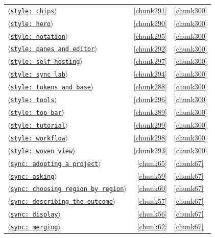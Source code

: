 \documentclass[10pt,a4paper]{article}
\newcounter{chunk}
\newcommand{\chunkname}[1]{\ensuremath{\langle}\texttt{#1}\ensuremath{\rangle}}
\begin{document}
\begin{longtable}{@{}p{}rp{}@{}}
\hyperref[chunk291]{\chunkname{style: chips}} & \ref*{chunk291} & \hyperref[chunk300]{\ref*{chunk300}} \\
\hyperref[chunk290]{\chunkname{style: hero}} & \ref*{chunk290} & \hyperref[chunk300]{\ref*{chunk300}} \\
\hyperref[chunk295]{\chunkname{style: notation}} & \ref*{chunk295} & \hyperref[chunk300]{\ref*{chunk300}} \\
\hyperref[chunk292]{\chunkname{style: panes and editor}} & \ref*{chunk292} & \hyperref[chunk300]{\ref*{chunk300}} \\
\hyperref[chunk297]{\chunkname{style: self-hosting}} & \ref*{chunk297} & \hyperref[chunk300]{\ref*{chunk300}} \\
\hyperref[chunk294]{\chunkname{style: sync lab}} & \ref*{chunk294} & \hyperref[chunk300]{\ref*{chunk300}} \\
\hyperref[chunk288]{\chunkname{style: tokens and base}} & \ref*{chunk288} & \hyperref[chunk300]{\ref*{chunk300}} \\
\hyperref[chunk296]{\chunkname{style: tools}} & \ref*{chunk296} & \hyperref[chunk300]{\ref*{chunk300}} \\
\hyperref[chunk289]{\chunkname{style: top bar}} & \ref*{chunk289} & \hyperref[chunk300]{\ref*{chunk300}} \\
\hyperref[chunk299]{\chunkname{style: tutorial}} & \ref*{chunk299} & \hyperref[chunk300]{\ref*{chunk300}} \\
\hyperref[chunk298]{\chunkname{style: workflow}} & \ref*{chunk298} & \hyperref[chunk300]{\ref*{chunk300}} \\
\hyperref[chunk293]{\chunkname{style: woven view}} & \ref*{chunk293} & \hyperref[chunk300]{\ref*{chunk300}} \\
\hyperref[chunk65]{\chunkname{sync: adopting a project}} & \ref*{chunk65} & \hyperref[chunk67]{\ref*{chunk67}} \\
\hyperref[chunk59]{\chunkname{sync: asking}} & \ref*{chunk59} & \hyperref[chunk67]{\ref*{chunk67}} \\
\hyperref[chunk60]{\chunkname{sync: choosing region by region}} & \ref*{chunk60} & \hyperref[chunk67]{\ref*{chunk67}} \\
\hyperref[chunk57]{\chunkname{sync: describing the outcome}} & \ref*{chunk57} & \hyperref[chunk67]{\ref*{chunk67}} \\
\hyperref[chunk56]{\chunkname{sync: display}} & \ref*{chunk56} & \hyperref[chunk67]{\ref*{chunk67}} \\
\hyperref[chunk62]{\chunkname{sync: merging}} & \ref*{chunk62} & \hyperref[chunk67]{\ref*{chunk67}} \\

\end{longtable}
\end{document}
